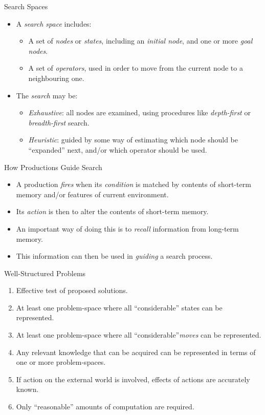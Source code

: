 \documentclass{article}
\begin{document}
\begin{slide}{}
{\Large Search Spaces}
\begin{itemize}
\item A {\em search space} includes:
\begin{itemize}
\item A set of {\em nodes} or {\em states}, including an {\em initial
node}, and one or more {\em goal nodes}. 
\item A set of {\em operators}, used in order to move from the current node
to a neighbouring one.
\end{itemize}
\item The {\em search} may be:
\begin{itemize}
\item {\em Exhaustive}: all nodes are examined, using procedures like
{\em depth-first} or {\em breadth-first} search.
\item {\em Heuristic}: guided by some way of estimating which node
should be ``expanded'' next, and/or which operator should be used.
\end{itemize}
\end{itemize}
\end{slide}

\begin{slide}{}
{\Large How Productions Guide Search}
\begin{itemize}
\item A production {\em fires} when its {\em condition} is matched by
contents of short-term memory and/or features of current environment.
\item Its {\em action} is then to alter the contents of short-term
memory.
\item An important way of doing this is to {\em recall} information
from long-term memory.
\item This information can then be used in {\em guiding} a search process.
\end{itemize}
\end{slide}

\begin{slide}{}
{\Large Well-Structured Problems}
\begin{enumerate}
\item Effective test of proposed solutions.
\item At least one problem-space where all ``considerable'' states can
be represented. 
\item At least one problem-space where all ``considerable''{\em moves}
can be represented.
\item Any relevant knowledge that can be acquired can be represented
in terms of one or more problem-spaces.
\item If action on the external world is involved, effects of actions
are accurately known.
\item Only ``reasonable''
amounts of computation are required.
\end{enumerate}
\end{slide}
\end{document}
